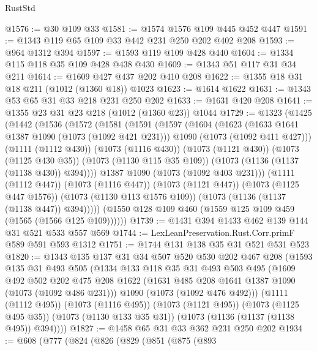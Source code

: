 \begin{lexlean}{RustStd}
\begin{coremodule}
@1576 := @30 @109 @33
@1581 := @1574 @1576 @109 @445 @452 @447
@1591 := @1343 @119 @65 @109 @33 @442 @231 @250 @202 @402 @208
@1593 := @964 @1312 @394
@1597 := @1593 @119 @109 @428 @440
@1604 := @1334 @115 @118 @35 @109 @428 @438 @430
@1609 := @1343 @51 @117 @31 @34 @211
@1614 := @1609 @427 @437 @202 @410 @208
@1622 := @1355 @18 @31 @18 @211 (@1012 (@1360 @18)) @1023
@1623 := @1614 @1622
@1631 := @1343 @53 @65 @31 @33 @218 @231 @250 @202
@1633 := @1631 @420 @208
@1641 := @1355 @23 @31 @23 @218 (@1012 (@1360 @23)) @1044
@1729 := @1323
    (@1425
      (@1442
        (@1536
          (@1572
            (@1581
              (@1591
                (@1597
                  (@1604
                    (@1623
                      (@1633 @1641 @1387 @1090 (@1073 (@1092 @421 @231)))
                      @1090
                      (@1073 (@1092 @411 @427)))
                    (@1111 (@1112 @430))
                    (@1073 (@1116 @430))
                    (@1073 (@1121 @430))
                    (@1073 (@1125 @430 @35))
                    (@1073 (@1130 @115 @35 @109))
                    (@1073 (@1136 (@1137 (@1138 @430)) @394))))
                @1387
                @1090
                (@1073 (@1092 @403 @231)))
              (@1111 (@1112 @447))
              (@1073 (@1116 @447))
              (@1073 (@1121 @447))
              (@1073 (@1125 @447 @1576))
              (@1073 (@1130 @113 @1576 @109))
              (@1073 (@1136 (@1137 (@1138 @447)) @394)))))
        (@1550 @128 @109 @460 (@1559 @125 @109 @459 (@1565 (@1566 @125 @109))))))
@1739 := @1431 @394 @1433 @462 @139 @144 @31 @521 @533 @557 @569
@1744 := LexLeanPreservation.Rust.Corr.primF @589 @591 @593 @1312
@1751 := @1744 @131 @138 @35 @31 @521 @531 @523
@1820 := @1343
    @135
    @137
    @31
    @34
    @507
    @520
    @530
    @202
    @467
    @208
    (@1593
      @135
      @31
      @493
      @505
      (@1334
        @133
        @118
        @35
        @31
        @493
        @503
        @495
        (@1609
          @492
          @502
          @202
          @475
          @208
          @1622
          (@1631 @485 @208 @1641 @1387 @1090 (@1073 (@1092 @486 @231)))
          @1090
          (@1073 (@1092 @476 @492)))
        (@1111 (@1112 @495))
        (@1073 (@1116 @495))
        (@1073 (@1121 @495))
        (@1073 (@1125 @495 @35))
        (@1073 (@1130 @133 @35 @31))
        (@1073 (@1136 (@1137 (@1138 @495)) @394))))
@1827 := @1458 @65 @31 @33 @362 @231 @250 @202
@1934 := @608
    (@777
      (@824
        (@826
          (@829
            (@851
              (@875
                (@893

\end{coremodule}
\end{lexlean}
